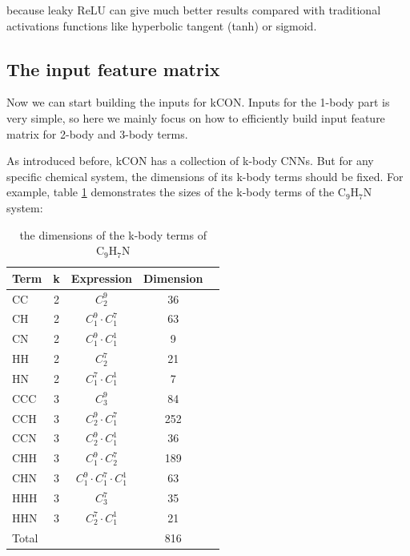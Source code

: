 \noindent because leaky ReLU can give much better results compared with traditional activations 
functions like hyperbolic tangent (tanh) or sigmoid.

\subsection{The input feature matrix}

Now we can start building the inputs for kCON. Inputs for the 1-body part is very simple, so 
here we mainly focus on how to efficiently build input feature matrix for 2-body and 3-body 
terms.

As introduced before, kCON has a collection of k-body CNNs. But for any specific chemical 
system, the dimensions of its k-body terms should be fixed. For example, table \ref{tab:table1}
demonstrates the sizes of the k-body terms of the $\mathrm{C}_9 \mathrm{H}_7 \mathrm{N}$ 
system:

\begin{table}[h]
	\center
	\begin{tabular}{l*{3}{c}r}
		Term              & k & Expression & Dimension \\
		\hline
		CC    & 2 & $C^9_2$                         &  36 \\
		CH    & 2 & $C^9_1 \cdot C^7_1$             &  63 \\
		CN    & 2 & $C^9_1 \cdot C^1_1$             &   9 \\
		HH    & 2 & $C^7_2$                         &  21 \\
		HN    & 2 & $C^7_1 \cdot C^1_1$             &   7 \\
		CCC   & 3 & $C^9_3$                         &  84 \\
		CCH   & 3 & $C^9_2 \cdot C^7_1$             & 252 \\
		CCN   & 3 & $C^9_2 \cdot C^1_1$             &  36 \\
		CHH   & 3 & $C^9_1 \cdot C^7_2$             & 189 \\
		CHN   & 3 & $C^9_1 \cdot C^7_1 \cdot C^1_1$ &  63 \\
		HHH   & 3 & $C^7_3$                         &  35 \\
		HHN   & 3 & $C^7_2 \cdot C^1_1$             &  21 \\
		Total &   &                                 & 816
	\end{tabular}
	\caption{
		the dimensions of the k-body terms of $\mathrm{C}_9 \mathrm{H}_7 \mathrm{N}$
	}
	\label{tab:table1}
\end{table}

